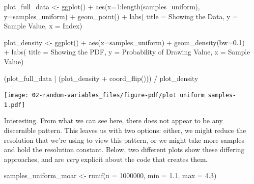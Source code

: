 \documentclass[
  letterpaper,
  DIV=11,
  numbers=noendperiod]{scrreprt}
\newenvironment{Shaded}{\begin{snugshade}}{\end{snugshade}}
\newcommand{\AttributeTok}[1]{\textcolor[rgb]{0.40,0.45,0.13}{#1}}
\newcommand{\DecValTok}[1]{\textcolor[rgb]{0.68,0.00,0.00}{#1}}
\newcommand{\FloatTok}[1]{\textcolor[rgb]{0.68,0.00,0.00}{#1}}
\newcommand{\FunctionTok}[1]{\textcolor[rgb]{0.28,0.35,0.67}{#1}}
\newcommand{\NormalTok}[1]{\textcolor[rgb]{0.00,0.23,0.31}{#1}}
\newcommand{\OtherTok}[1]{\textcolor[rgb]{0.00,0.23,0.31}{#1}}
\newcommand{\SpecialCharTok}[1]{\textcolor[rgb]{0.37,0.37,0.37}{#1}}
\newcommand{\StringTok}[1]{\textcolor[rgb]{0.13,0.47,0.30}{#1}}
\begin{document}
\begin{Shaded}
\begin{Highlighting}[]
\NormalTok{plot\_full\_data }\OtherTok{\textless{}{-}} \FunctionTok{ggplot}\NormalTok{() }\SpecialCharTok{+} 
  \FunctionTok{aes}\NormalTok{(}\AttributeTok{x=}\DecValTok{1}\SpecialCharTok{:}\FunctionTok{length}\NormalTok{(samples\_uniform), }\AttributeTok{y=}\NormalTok{samples\_uniform) }\SpecialCharTok{+} 
  \FunctionTok{geom\_point}\NormalTok{()  }\SpecialCharTok{+} 
  \FunctionTok{labs}\NormalTok{(}
    \AttributeTok{title =} \StringTok{\textquotesingle{}Showing the Data\textquotesingle{}}\NormalTok{, }
    \AttributeTok{y     =} \StringTok{\textquotesingle{}Sample Value\textquotesingle{}}\NormalTok{, }
    \AttributeTok{x     =} \StringTok{\textquotesingle{}Index\textquotesingle{}}\NormalTok{)}

\NormalTok{plot\_density }\OtherTok{\textless{}{-}} \FunctionTok{ggplot}\NormalTok{() }\SpecialCharTok{+} 
  \FunctionTok{aes}\NormalTok{(}\AttributeTok{x=}\NormalTok{samples\_uniform) }\SpecialCharTok{+} 
  \FunctionTok{geom\_density}\NormalTok{(}\AttributeTok{bw=}\FloatTok{0.1}\NormalTok{)   }\SpecialCharTok{+} 
  \FunctionTok{labs}\NormalTok{(}
    \AttributeTok{title =} \StringTok{\textquotesingle{}Showing the PDF\textquotesingle{}}\NormalTok{, }
    \AttributeTok{y     =} \StringTok{\textquotesingle{}Probability of Drawing Value\textquotesingle{}}\NormalTok{, }
    \AttributeTok{x     =} \StringTok{\textquotesingle{}Sample Value\textquotesingle{}}\NormalTok{)}

\NormalTok{(plot\_full\_data }\SpecialCharTok{|}\NormalTok{ (plot\_density }\SpecialCharTok{+} \FunctionTok{coord\_flip}\NormalTok{())) }\SpecialCharTok{/} 
\NormalTok{  plot\_density }
\end{Highlighting}
\end{Shaded}

\texttt{[image: 02-random-variables\_files/figure-pdf/plot uniform samples-1.pdf]}

Interesting. From what we can see here, there does not appear to be any
discernible pattern. This leaves us with two options: either, we might
reduce the resolution that we're using to view this pattern, or we might
take more samples and hold the resolution constant. Below, two different
plots show these differing approaches, and are \emph{very} explicit
about the code that creates them.

\begin{Shaded}
\begin{Highlighting}[]
\NormalTok{samples\_uniform\_moar }\OtherTok{\textless{}{-}} \FunctionTok{runif}\NormalTok{(}\AttributeTok{n =} \DecValTok{1000000}\NormalTok{, }\AttributeTok{min =} \FloatTok{1.1}\NormalTok{, }\AttributeTok{max =} \FloatTok{4.3}\NormalTok{)}
\end{Highlighting}
\end{Shaded}
\end{document}
